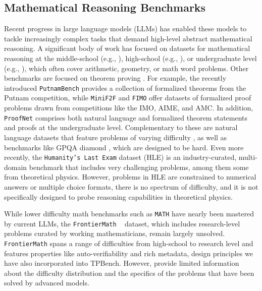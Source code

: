 \subsection{Mathematical Reasoning Benchmarks}
\label{sec:related_benchmarks}
Recent progress in large language models (LLMs) has enabled these models to tackle increasingly complex tasks that demand high-level abstract mathematical reasoning. A significant body of work has focused on datasets for mathematical reasoning at the middle-school (e.g., \citep{cobbe2021training}), high-school (e.g., \citep{hendrycks2021measuring}), or undergraduate level (e.g., \citep{ling2017program}), which often cover arithmetic, geometry, or math word problems. Other benchmarks are focused on theorem proving \citep{tsoukalas2024putnambenchevaluatingneuraltheoremprovers,zheng2022minif2fcrosssystembenchmarkformal,liu2023fimochallengeformaldataset}. For example, the recently introduced \texttt{PutnamBench} \cite{tsoukalas2024putnambenchevaluatingneuraltheoremprovers} provides a collection of formalized theorems from the Putnam competition, while \texttt{MiniF2F} \cite{zheng2022minif2fcrosssystembenchmarkformal} and \texttt{FIMO} \cite{liu2023fimochallengeformaldataset} offer datasets of formalized proof problems drawn from competitions like the IMO, AIME, and AMC. In addition, \texttt{ProofNet} \cite{azerbayev2023proofnetautoformalizingformallyproving} comprises both natural language and formalized theorem statements and proofs at the undergraduate level. Complementary to these are natural language datasets that feature problems of varying difficulty \cite{hendrycks2021measuring, cobbe2021trainingverifierssolvemath}, as well as benchmarks like GPQA diamond \citep{rein2023gpqa}, which are designed to be hard.
Even more recently, the \texttt{Humanity's Last Exam} dataset \cite{phan2025humanity} (HLE) is an industry-curated, multi-domain benchmark that includes very challenging problems, among them some from theoretical physics. However, problems in HLE are constrained to numerical answers or multiple choice formats, there is no spectrum of difficulty, and it is not specifically designed to probe reasoning capabilities in theoretical physics.


While lower difficulty math benchmarks such as \texttt{MATH} \cite{hendrycks2021measuring} have nearly been mastered by current LLMs, the \texttt{FrontierMath} ~\cite{glazer2024frontiermath} dataset, which includes research-level problems curated by working mathematicians, remain largely unsolved. \texttt{FrontierMath} spans a range of difficulties from high-school to research level and features properties like auto-verifiability and rich metadata, design principles we have also incorporated into TPBench. However, \citet{glazer2024frontiermath} provide limited information about the difficulty distribution and the specifics of the problems that have been solved by advanced models.


